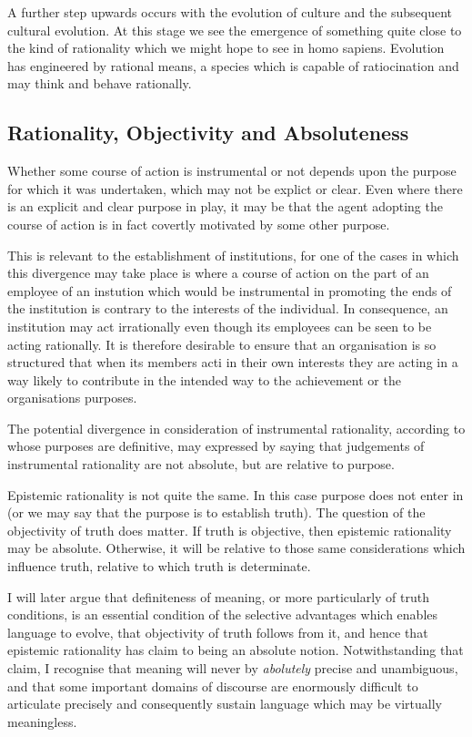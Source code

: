 \documentclass[10pt,titlepage]{article}
\begin{document}
A further step upwards occurs with the evolution of culture and the subsequent cultural evolution.
At this stage we see the emergence of something quite close to the kind of rationality which we might hope to see in homo sapiens.
Evolution has engineered by rational means, a species which is capable of ratiocination and may think and behave rationally.

\subsection{Rationality, Objectivity and Absoluteness}

Whether some course of action is instrumental or not depends upon the purpose for which it was undertaken, which may not be explict or clear.
Even where there is an explicit and clear purpose in play, it may be that the agent adopting the course of action is in fact covertly motivated by some other purpose.

This is relevant to the establishment of institutions, for one of the cases in which this divergence may take place is where a course of action on the part of an employee of an instution  which would be instrumental in promoting the ends of the institution is contrary to the interests of the individual.
In consequence, an institution may act irrationally even though its employees can be seen to be acting rationally.
It is therefore desirable to ensure that an organisation is so structured that when its members acti in their own interests they are acting in a way likely to contribute in the intended way to the achievement or the organisations purposes.

The potential divergence in consideration of instrumental rationality, according to whose purposes are definitive, may expressed by saying that judgements of instrumental rationality are not absolute, but are relative to purpose.

Epistemic rationality is not quite the same.
In this case purpose does not enter in (or we may say that the purpose is to establish truth).
The question of the objectivity of truth does matter.
If truth is objective, then epistemic rationality may be absolute.
Otherwise, it will be relative to those same considerations which influence truth, relative to which truth is determinate.

I will later argue that definiteness of meaning, or more particularly of truth conditions, is an essential condition of the selective advantages which enables language to evolve, that objectivity of truth follows from it, and hence that epistemic rationality has claim to being an absolute notion.
Notwithstanding that claim, I recognise that meaning will never by \emph{abolutely} precise and unambiguous, and that some important domains of discourse are enormously difficult to articulate precisely and consequently sustain language which may be virtually meaningless.
\end{document}
